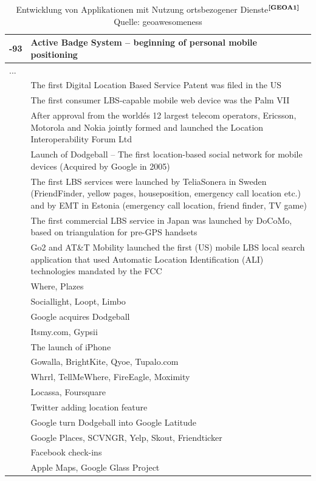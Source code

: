 \begin{table}
  \centering
  \begin{tabulary}{\columnwidth}{| >{\centering}m{1.5cm} | L |}
  -93 & Active Badge System – beginning of personal mobile positioning \\ \hline
    ... &  \\  & The first Digital Location Based Service Patent was filed in the US \\  & The first consumer LBS-capable mobile web device was the Palm VII \\  & After approval from the world\'{e}s 12 largest telecom operators, Ericsson, Motorola and Nokia jointly formed and launched the Location Interoperability Forum Ltd \\  & Launch of Dodgeball – The first location-based social network for mobile devices (Acquired by Google in 2005) \\  & The first LBS services were launched by TeliaSonera in Sweden (FriendFinder, yellow pages, houseposition, emergency call location etc.) and by EMT in Estonia (emergency call location, friend finder, TV game) \\  & The first commercial LBS service in Japan was launched by DoCoMo, based on triangulation for pre-GPS handsets \\  & Go2 and AT\&T Mobility launched the first (US) mobile LBS local search application that used Automatic Location Identification (ALI) technologies mandated by the FCC \\  & Where, Plazes \\  & Sociallight, Loopt, Limbo \\  & Google acquires Dodgeball \\  & Itsmy.com, Gypsii \\  & The launch of iPhone \\  & Gowalla, BrightKite, Qyoe, Tupalo.com \\  & Whrrl, TellMeWhere, FireEagle, Moximity \\  & Locassa, Foursquare \\  & Twitter adding location feature \\  & Google turn Dodgeball into Google Latitude \\  & Google Places, SCVNGR, Yelp, Skout, Friendticker \\  & Facebook check-ins \\  & Apple Maps, Google Glass Project \\ \hline
  \end{tabulary}
  \caption{Entwicklung von Applikationen mit Nutzung ortsbezogener Dienste$^{\textbf{\ref{GEOA1}}}$ \newline Quelle: geoawesomeness}
\end{table}
\addtocounter{footnote}{1}


